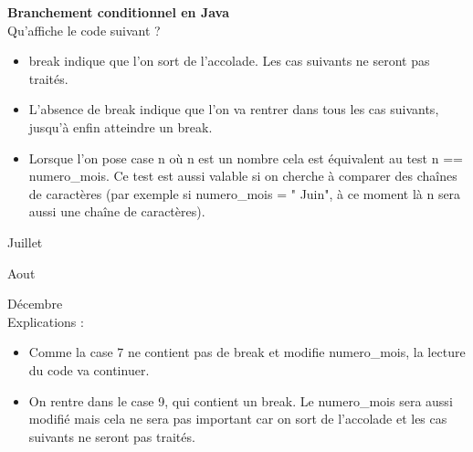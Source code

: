 \begin{Exercice}[20 minutes] \textbf{Branchement conditionnel en Java}\\
  Qu'affiche le code suivant ?   \\
  
  
   
    \begin{conseil}
      	\begin{itemize}
      		\item break indique que l'on sort de l'accolade. Les cas suivants ne seront pas traités.
      		\item L'absence de break indique que l'on va rentrer dans tous les cas suivants, jusqu'à enfin atteindre un break.
      		\item Lorsque l'on pose case n où n est un nombre cela est équivalent au test n == numero\_mois. Ce test est aussi valable si on cherche à comparer des chaînes de caractères (par exemple si numero\_mois = " Juin", à ce moment là n sera aussi une chaîne de caractères).
      	\end{itemize}
        
    \end{conseil}
    \begin{solution}
    
    Juillet
    
	Aout
	
	Décembre \\
	
	Explications : \\
	
	\begin{itemize}
      		\item Comme la case 7 ne contient pas de break et modifie numero\_mois, la lecture du code va continuer.
      		\item On rentre dans le case 9, qui contient un break. Le numero\_mois sera aussi modifié mais cela ne sera pas important car on sort de l'accolade et les cas suivants ne seront pas traités.
      \end{itemize}
           
    \end{solution}   
\end{Exercice}

